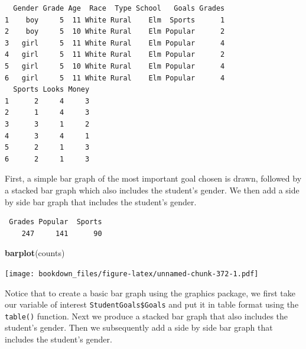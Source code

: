 \documentclass[
]{krantz}
\makeatletter
\newenvironment{Shaded}{\begin{snugshade}}{\end{snugshade}}
\newcommand{\KeywordTok}[1]{\textcolor[rgb]{0.27,0.27,0.27}{\textbf{#1}}}
\newcommand{\NormalTok}[1]{#1}
\newcommand{\OperatorTok}[1]{\textcolor[rgb]{0.43,0.43,0.43}{\textbf{#1}}}
\newcommand{\StringTok}[1]{\textcolor[rgb]{0.5,0.5,0.5}{#1}}
\newenvironment{kframe}{%
\medskip{}
\setlength{\fboxsep}{.8em}
 \def\at@end@of@kframe{}%
 \ifinner\ifhmode%
  \def\at@end@of@kframe{\end{minipage}}%
  \begin{minipage}{\columnwidth}%
 \fi\fi%
 \def\FrameCommand##1{\hskip\@totalleftmargin \hskip-\fboxsep
 \colorbox{shadecolor}{##1}\hskip-\fboxsep
     \hskip-\linewidth \hskip-\@totalleftmargin \hskip\columnwidth}%
 \MakeFramed {\advance\hsize-\width
   \@totalleftmargin\z@ \linewidth\hsize
   \@setminipage}}%
 {\par\unskip\endMakeFramed%
 \at@end@of@kframe}
\renewenvironment{Shaded}{\begin{kframe}}{\end{kframe}}
\makeatother
\begin{document}
\begin{verbatim}
  Gender Grade Age  Race  Type School   Goals Grades
1    boy     5  11 White Rural    Elm  Sports      1
2    boy     5  10 White Rural    Elm Popular      2
3   girl     5  11 White Rural    Elm Popular      4
4   girl     5  11 White Rural    Elm Popular      2
5   girl     5  10 White Rural    Elm Popular      4
6   girl     5  11 White Rural    Elm Popular      4
  Sports Looks Money
1      2     4     3
2      1     4     3
3      3     1     2
4      3     4     1
5      2     1     3
6      2     1     3
\end{verbatim}

First, a simple bar graph of the most important goal chosen is drawn, followed by a stacked bar graph which also includes the student's gender. We then add a side by side bar graph that includes the student's gender.

\begin{Shaded}
\end{Shaded}

\begin{verbatim}
 Grades Popular  Sports 
    247     141      90 
\end{verbatim}

\begin{Shaded}
\begin{Highlighting}[]
\KeywordTok{barplot}\NormalTok{(counts)}
\end{Highlighting}
\end{Shaded}

\texttt{[image: bookdown\_files/figure-latex/unnamed-chunk-372-1.pdf]}

Notice that to create a basic bar graph using the graphics package, we first take our variable of interest \texttt{StudentGoals\$Goals} and put it in table format using the \texttt{table()} function. Next we produce a stacked bar graph that also includes the student's gender. Then we subsequently add a side by side bar graph that includes the student's gender.
\end{document}

